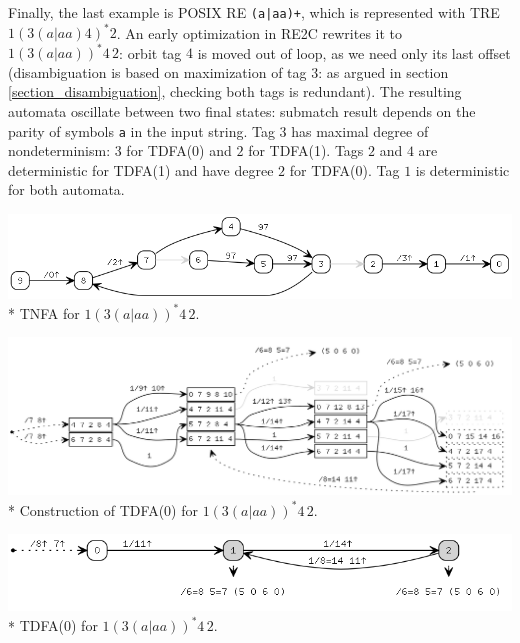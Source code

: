 \documentclass{article}
\theoremstyle{definition}
\begin{document}
\begin{multicols}{2}
Finally, the last example is POSIX RE \texttt{(a|aa)+}, which is represented with TRE $1 (3 (a | aa) 4)^* 2$.
An early optimization in RE2C rewrites it to $1 (3 (a | aa) )^* 4 \, 2$:
orbit tag $4$ is moved out of loop, as we need only its last offset
(disambiguation is based on maximization of tag $3$: as argued in section \ref{section_disambiguation}, checking both tags is redundant).
The resulting automata oscillate between two final states:
submatch result depends on the parity of symbols \texttt{a} in the input string.
Tag $3$ has maximal degree of nondeterminism: $3$ for TDFA(0) and $2$ for TDFA(1).
Tags $2$ and $4$ are deterministic for TDFA(1) and have degree $2$ for TDFA(0).
Tag $1$ is deterministic for both automata.
\begin{center}
\includegraphics[width=\linewidth]{img/example4/tnfa.png}\\*
\footnotesize{TNFA for $1 (3 (a | aa) )^* 4 \, 2$.} \\
\end{center}
\begin{center}
\includegraphics[width=\linewidth]{img/example4/tdfa0_raw.png}\\*
\footnotesize{Construction of TDFA(0) for $1 (3 (a | aa) )^* 4 \, 2$.} \\
\end{center}
\begin{center}
\includegraphics[width=\linewidth]{img/example4/tdfa0.png}\\*
\footnotesize{TDFA(0) for $1 (3 (a | aa) )^* 4 \, 2$.} \\
\end{center}

\end{multicols}
\end{document}
